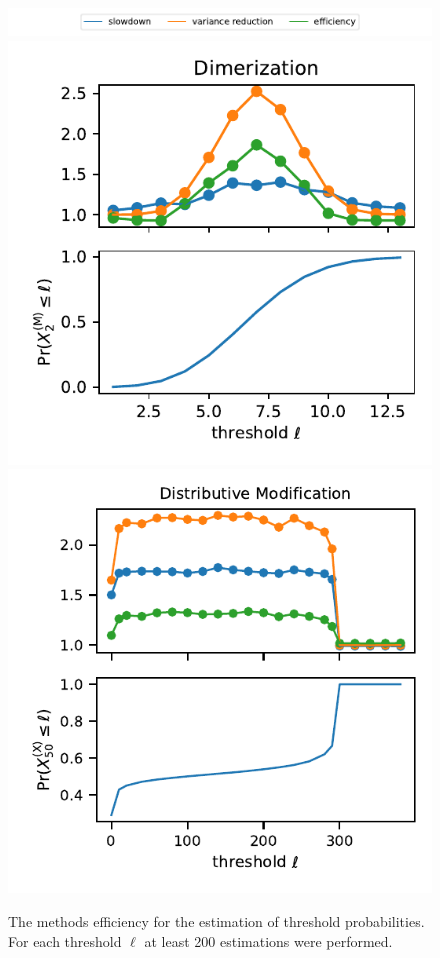 \begin{figure}[htb]
    \centering
    \includegraphics[scale=0.65]{gfx/legend_thres.pdf}\\
    \includegraphics[width=.49\textwidth]{gfx/dim_thresholds.pdf}
    \includegraphics[width=.49\textwidth]{gfx/dm_threholds.pdf}
    \caption[\ac{CV} for probabililty estimation]{The methods efficiency for the estimation of threshold probabilities. For each threshold $\ell$ at least 200 estimations were performed.}
    \label{fig:thresholds}
\end{figure}



